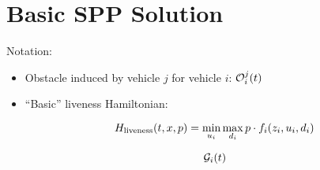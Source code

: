 \section{Basic SPP Solution\label{sec:basic}}
Notation:
\begin{itemize}
\item Obstacle induced by vehicle $j$ for vehicle $i$: $\mathcal{O}_i^j(t)$
\item ``Basic'' liveness Hamiltonian:

\begin{equation}
H_\text{liveness}(t, x, p) = \min_{u_i} \max_{d_i} p \cdot f_i(z_i, u_i, d_i)
\end{equation}

\begin{equation}
\label{eq:obsseti}
\mathcal{G}_i(t)
\end{equation}
\end{itemize}
